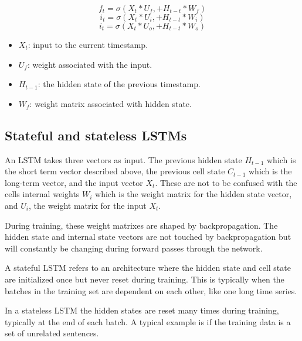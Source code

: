 \begin{equation}
  f_t = \sigma (X_t * U_f, + H_{t-t} * W_f)
  \label{eq:lstm:forget-gate}
\end{equation}
\begin{equation}
  i_t = \sigma (X_t * U_i, + H_{t-t} * W_i)
  \label{eq:lstm:input_gate}
\end{equation}
\begin{equation}
  i_t = \sigma (X_t * U_o, + H_{t-t} * W_o)
  \label{eq:lstm:output-gate}
\end{equation}
\begin{itemize}
  \item $X_t$: input to the current timestamp.
  \item $U_f$: weight associated with the input.
  \item $H_{t-1}$: the hidden state of the previous timestamp.
  \item $W_f$: weight matrix associated with hidden state.
\end{itemize}






\subsection*{Stateful and stateless LSTMs}
\label{section:BT:stateful-vs-stateless}
An LSTM takes three vectors as input. The previous hidden state $H_{t-1}$
which is the short term vector described above, the previous cell state
$C_{t-1}$ which is the long-term vector, and the input vector $X_t$.
These are not to be confused with the cells internal weights $W_i$
which is the weight matrix for the hidden state vector, and $U_i$,
the weight matrix for the input $X_t$.

During training, these weight matrixes are shaped by backpropagation.
The hidden state and internal state vectors are not touched by backpropagation
but will constantly be changing during forward passes through the network.

A stateful LSTM refers to an architecture where the hidden state and cell state
are initialized once but never reset during training. This is typically
when the batches in the training set are dependent on each other, like
one long time series.

In a stateless LSTM the hidden states are reset many times during training,
typically at the end of each batch. A typical example is if the training
data is a set of unrelated sentences.


